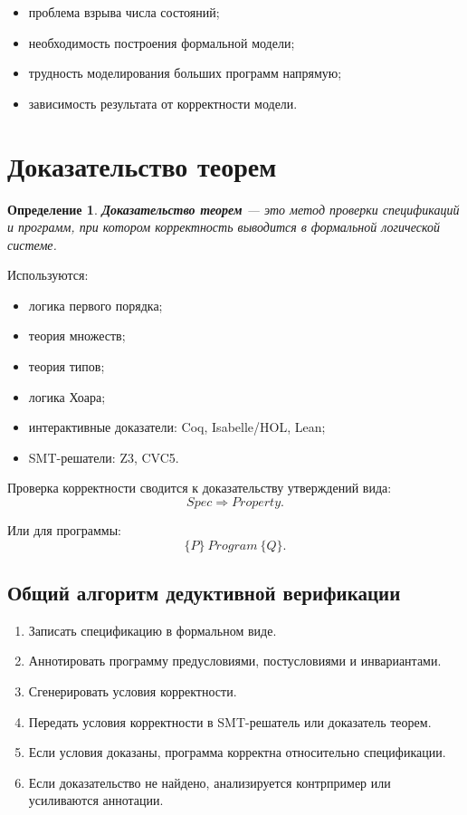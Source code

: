 \documentclass[12pt,a4paper]{article}
\newtheorem{definition}{Определение}
\begin{document}
\begin{itemize}
    \item проблема взрыва числа состояний;
    \item необходимость построения формальной модели;
    \item трудность моделирования больших программ напрямую;
    \item зависимость результата от корректности модели.
\end{itemize}

\section{Доказательство теорем}

\begin{definition}
\textbf{Доказательство теорем} --- это метод проверки спецификаций и программ, при котором корректность выводится в формальной логической системе.
\end{definition}

Используются:
\begin{itemize}
    \item логика первого порядка;
    \item теория множеств;
    \item теория типов;
    \item логика Хоара;
    \item интерактивные доказатели: Coq, Isabelle/HOL, Lean;
    \item SMT-решатели: Z3, CVC5.
\end{itemize}

Проверка корректности сводится к доказательству утверждений вида:
\[
    Spec \Rightarrow Property.
\]

Или для программы:
\[
    \{P\}\ Program\ \{Q\}.
\]

\subsection{Общий алгоритм дедуктивной верификации}

\begin{enumerate}
    \item Записать спецификацию в формальном виде.
    \item Аннотировать программу предусловиями, постусловиями и инвариантами.
    \item Сгенерировать условия корректности.
    \item Передать условия корректности в SMT-решатель или доказатель теорем.
    \item Если условия доказаны, программа корректна относительно спецификации.
    \item Если доказательство не найдено, анализируется контрпример или усиливаются аннотации.
\end{enumerate}
\end{document}
